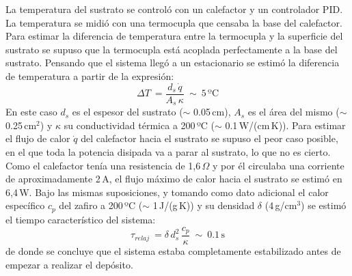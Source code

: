 La temperatura del sustrato se controló con un calefactor y un controlador PID. La temperatura se midió con una termocupla que censaba la base del calefactor. Para estimar la diferencia de temperatura entre la termocupla y la superficie del sustrato se supuso que la termocupla está acoplada perfectamente a la base del sustrato. Pensando que el sistema llegó a un estacionario se estimó la diferencia de temperatura a partir de la expresión\cite{incropera}:
\begin{equation}
	\Delta T \ = \frac{d_s\,\dot{q}}{A_s\,\kappa} \ \sim \ 5\,\mathrm{ºC}
	\label{eq:conduccion}
\end{equation}
\noindent
En este caso $d_s$ es el espesor del sustrato ($\sim$ 0.05\,cm), $A_s$ es el área del mismo ($\sim$\,0.25\,cm$^{2}$) y $\kappa$ su conductividad térmica a 200\,ºC ($\sim$ 0.1\,W/(cm\,K))\cite{tablaconductividad}. Para estimar el flujo de calor $\dot{q}$ del calefactor hacia el sustrato se supuso el peor caso posible, en el que toda la potencia disipada va a parar al sustrato, lo que no es cierto.  Como el calefactor tenía una resistencia de 1,6\,$\Omega$ y por él circulaba una corriente de aproximadamente 2\,A, el flujo máximo de calor hacia el sustrato se estimó en 6,4\,W. Bajo las mismas suposiciones, y tomando como dato adicional el calor específico $c_p$ del zafiro a 200\,ºC ($\sim$ 1\,J/(g\,K))\cite{tablacalor} y su densidad $\delta$ (4\,g/cm$^{3}$)\cite{Ekin2006} se estimó el tiempo característico del sistema:
\begin{equation}
	\tau_{relaj} \ = \delta\,d_s^2\,\frac{c_p}{\kappa} \ \sim \ 0.1\,\mathrm{s}
	\label{eq:relajacion}
\end{equation}
\noindent
de donde se concluye que el sistema estaba completamente estabilizado antes de empezar a realizar el depósito.
